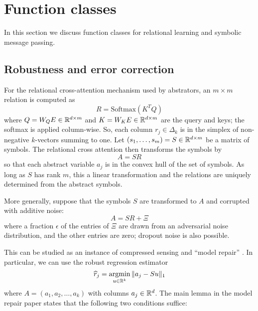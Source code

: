 
\section{Function classes}
\label{sec:function_spaces}

\def\rdot{\bigcdot}
\def\F{{\mathfrak{F}}}

In this section we discuss function classes for relational learning and symbolic message passing.

\subsection{Robustness and error correction}

For the relational cross-attention mechanism used by abstrators, an $m\times m$ relation 
is computed as 
\begin{equation}
  R = \mbox{Softmax}(K^T Q)
\end{equation}
where $Q = W_Q E\in \mathbb{R}^{d\times m}$ and $K = W_K E\in \mathbb{R}^{d\times m}$ are the query and keys; the softmax is applied column-wise. So, each column $r_j \in \Delta_k$ is in the simplex of 
non-negative $k$-vectors summing to one. Let $(s_1,\ldots, s_m) = S\in\mathbb{R}^{d\times m}$ be
a matrix of symbols. The relational cross attention then transforms the symbols by 
\begin{equation}
  A = SR
\end{equation}
so that each abstract variable $a_j$ is in the convex hull of the set of symbols.
As long as $S$ has rank $m$, this a linear transformation and the relations are 
uniquely determined from the abstract symbols. 

More generally, suppose that the symbols $S$ are transformed to $A$ and corrupted with additive noise:
\begin{equation}
  A = SR + \Xi
\end{equation}
where a fraction $\epsilon$ of the entries of $\Xi$ are drawn from an adversarial noise distribution, and the other entries are zero; dropout noise is also possible. 

This can be studied as an  instance of compressed sensing and ``model repair'' \citep{model_repair}.  In particular, we can use the  robust regression estimator
\begin{equation}
  \hat r_j = \argmin_{u \in\reals^k} \| a_j - S u\|_1 \label{eq:lp}
\end{equation}
where $A = (a_1,a_2,\ldots, a_k)$ with columns $a_j\in\mathbb{R}^d$.
The main lemma in the model repair paper states that the following two conditions suffice:

